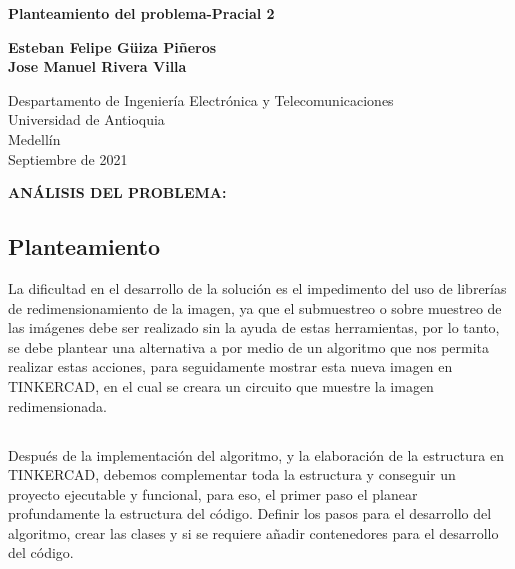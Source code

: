 \documentclass{article}
\begin{document}
\begin{titlepage}
    \begin{center}
        \vspace*{1cm}
            
        \Huge
        \textbf{Planteamiento del problema-Pracial 2}
            
        \vspace{0.5cm}
        \LARGE
        
            
        \vspace{5cm}
            
        \textbf{Esteban Felipe Güiza Piñeros}\\
        \textbf{Jose Manuel Rivera Villa }
            
        \vfill
            
        \vspace{0.8cm}
            
        \Large
        Despartamento de Ingeniería Electrónica y Telecomunicaciones\\
        Universidad de Antioquia\\
        Medellín\\
        Septiembre de 2021
            
    \end{center}
\end{titlepage}
\begin{center}
\Huge
\textbf{ANÁLISIS DEL PROBLEMA: }
\end{center}


\subsection{Planteamiento}
La dificultad en el desarrollo de la solución es el impedimento del uso de librerías de redimensionamiento de la imagen, ya que el submuestreo o sobre muestreo de las imágenes debe ser realizado sin la ayuda de estas herramientas, por lo tanto, se debe plantear una alternativa a por medio de un algoritmo que nos permita realizar estas acciones, para seguidamente mostrar esta nueva imagen en TINKERCAD, en el cual se creara un circuito que muestre la imagen redimensionada.

\subsection{}
Después de la implementación del algoritmo, y la elaboración de la estructura en TINKERCAD, debemos complementar toda la estructura y conseguir un proyecto ejecutable y funcional, para eso, el primer paso el planear profundamente la estructura del código. Definir los pasos para el desarrollo del algoritmo, crear las clases y si se requiere añadir contenedores para el desarrollo del código. 
\end{document}
